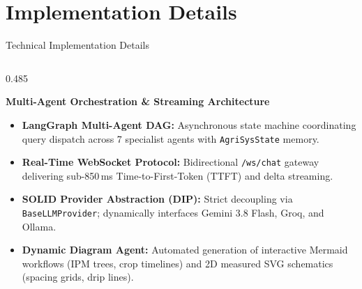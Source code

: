 \documentclass[aspectratio=169, 10pt]{beamer}
\begin{document}
\section{Implementation Details}
\begin{frame}{Technical Implementation Details}
    \vspace*{-0.35cm}
    \begin{columns}[T,onlytextwidth]
        \begin{column}{0.485\textwidth}
            \begin{block}{\footnotesize \textbf{Multi-Agent Orchestration \& Streaming Architecture}}
                \scriptsize
                \begin{itemize}\setlength{\itemsep}{2pt}\setlength{\parskip}{0pt}
                    \item \textbf{LangGraph Multi-Agent DAG:} Asynchronous state machine coordinating query dispatch across 7 specialist agents with \texttt{AgriSysState} memory.
                    \item \textbf{Real-Time WebSocket Protocol:} Bidirectional \texttt{/ws/chat} gateway delivering sub-850\,ms Time-to-First-Token (TTFT) and delta streaming.
                    \item \textbf{SOLID Provider Abstraction (DIP):} Strict decoupling via \texttt{BaseLLMProvider}; dynamically interfaces Gemini 3.8 Flash, Groq, and Ollama.
                    \item \textbf{Dynamic Diagram Agent:} Automated generation of interactive Mermaid workflows (IPM trees, crop timelines) and 2D measured SVG schematics (spacing grids, drip lines).
                \end{itemize}
            \end{block}
        \end{column}


\end{columns}
\end{frame}
\end{document}
